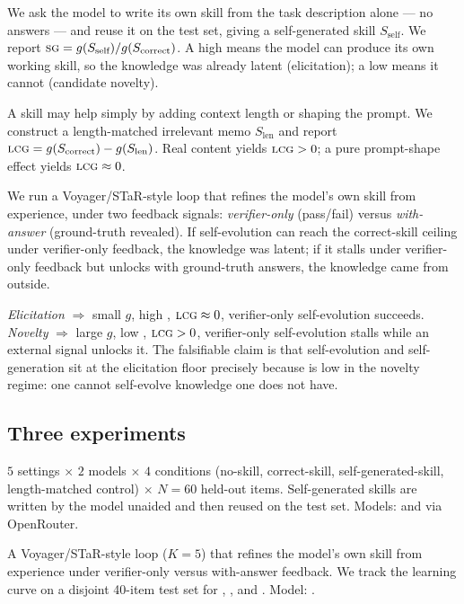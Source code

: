 We ask the model to write its own skill from the task
description alone --- no answers --- and reuse it on the test set, giving a self-generated skill
$S_{\text{self}}$. We report $\textsc{sg} = g(S_{\text{self}}) / g(S_{\text{correct}})$. A high \SG
means the model can produce its own working skill, so the knowledge was already latent
(elicitation); a low \SG means it cannot (candidate novelty).

 A skill may help simply by adding context length or
shaping the prompt. We construct a length-matched irrelevant memo $S_{\text{len}}$ and report
$\textsc{lcg} = g(S_{\text{correct}}) - g(S_{\text{len}})$. Real content yields $\textsc{lcg}>0$; a pure
prompt-shape effect yields $\textsc{lcg}\approx0$.

 We run a Voyager/STaR-style loop that refines the model's
own skill from experience, under two feedback signals: \emph{verifier-only} (pass/fail) versus
\emph{with-answer} (ground-truth revealed). If self-evolution can reach the correct-skill
ceiling under verifier-only feedback, the knowledge was latent; if it stalls under
verifier-only feedback but unlocks with ground-truth answers, the knowledge came from outside.

 \emph{Elicitation} $\Rightarrow$ small $g$, high \SG, $\textsc{lcg}\approx0$,
verifier-only self-evolution succeeds. \emph{Novelty} $\Rightarrow$ large $g$, low \SG,
$\textsc{lcg}>0$, verifier-only self-evolution stalls while an external signal unlocks it. The
falsifiable claim is that self-evolution and self-generation sit at the elicitation floor
precisely because \SG is low in the novelty regime: one cannot self-evolve knowledge one does
not have.

\subsection{Three experiments}
\label{sec:experiments}

 $5$ settings $\times$ $2$ models $\times$ $4$ conditions
(no-skill, correct-skill, self-generated-skill, length-matched control) $\times$ $N=60$
held-out items. Self-generated skills are written by the model unaided and then reused on the
test set. Models: \claude and \gpt via OpenRouter.

 A Voyager/STaR-style loop ($K=5$) that refines the
model's own skill from experience under verifier-only versus with-answer feedback. We track the
learning curve on a disjoint 40-item test set for \arithbnine, \vocabzeth, and \vocabes.
Model: \claude.

